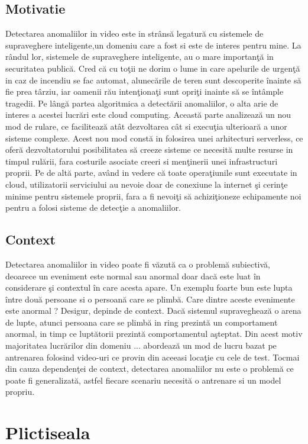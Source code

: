 \documentclass[a4paper,12pt]{report}
\begin{document}
\section{Motivatie}
Detectarea anomaliilor in video este in strânsă legatură cu sistemele de supraveghere inteligente,un domeniu care a fost si este de interes pentru mine. La rândul lor, sistemele de supraveghere inteligente, au o mare importanţă in securitatea publică. Cred că cu toţii ne dorim o lume in care apelurile de urgenţă in caz de incendiu se fac automat, alunecările de teren sunt descoperite înainte să fie prea târziu, iar oamenii rău intenţionaţi sunt opriţi inainte să se întâmple tragedii. Pe lângă partea algoritmica a detectării anomaliilor, o alta arie de interes a acestei lucrări este cloud computing. Această parte analizează un nou mod de rulare, ce facilitează atât dezvoltarea cât si execuţia ulterioară a unor sisteme complexe. Acest nou mod constă in folosirea unei arhitecturi serverless, ce oferă dezvoltatorului posibilitatea să creeze sisteme ce necesită multe resurse in timpul rulării, fara costurile asociate creeri si menţinerii unei infrastructuri proprii. Pe de altă parte, având in vedere că toate operaţiunile sunt executate in cloud, utilizatorii serviciului au nevoie doar de conexiune la internet şi cerinţe minime pentru sistemele proprii, fara a fi nevoiţi să achiziţioneze echipamente noi pentru a folosi sisteme de detecţie a anomaliilor.
\section{Context}
Detectarea anomaliilor in video poate fi văzută ca o problemă subiectivă, deoarece un eveniment este normal sau anormal doar dacă este luat în considerare şi contextul în care acesta apare. Un exemplu foarte bun este lupta între două persoane si o persoană care se plimbă. Care dintre aceste evenimente este anormal ? Desigur, depinde de context. Dacă sistemul supraveghează o arena de lupte, atunci persoana care se plimbă in ring prezintă un comportament anormal, in timp ce luptătorii prezintă comportamentul aşteptat. Din acest motiv majoritatea lucrărilor din domeniu \cite{cheng2015,ionescu2019object,sultani2018}...  abordează un mod de lucru bazat pe antrenarea folosind video-uri ce provin din aceeasi locaţie cu cele de test. Tocmai din cauza dependenţei de context, detectarea anomaliilor nu este o problemă ce poate fi generalizată, astfel fiecare scenariu necesită o antrenare si un model propriu.

\chapter{Plictiseala}
\blindtext[3]



\end{document}
